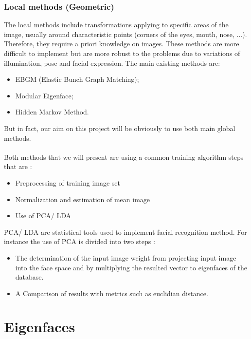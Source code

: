 \subsubsection{Local methods (Geometric)}

The local methods  include transformations applying to specific areas of the image, usually around characteristic points (corners of the eyes, mouth, nose, ...). Therefore, they require a priori knowledge on images. These methods are more difficult to implement but are more robust to the problems due to variations of illumination, pose and facial expression. The main existing methods are:
\begin{itemize}
\item EBGM (Elastic Bunch Graph Matching);
\item Modular Eigenface;
\item Hidden Markov Method.
\end{itemize}


But in fact, our aim on this project will be obviously to use both main global methods.

\paragraph{}

Both methods that we will present are using a common training algorithm steps that are :
\begin{itemize}
\item Preprocessing of training image set
\item Normalization and estimation of mean image
\item Use of PCA/ LDA
\end{itemize}

PCA/ LDA are statistical tools used to implement facial recognition method. For instance the use of PCA is divided into two steps :
\begin{itemize}
\item The determination of the input image weight from projecting input image into the face space and by multiplying the resulted vector to eigenfaces of the database.
\item A Comparison of results with metrics such as euclidian distance.
\end{itemize}


\section{Eigenfaces}
